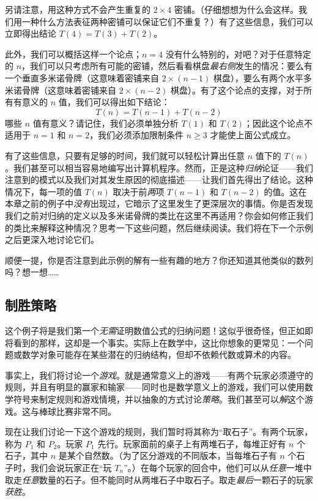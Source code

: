 另请注意，用这种方式不会产生重复的 $2 \times 4$ 密铺。（仔细想想为什么会这样。我们用一种什么方法表征两种密铺可以保证它们不重复？）有了这些信息，我们可以立即得出结论 $T(4) = T(3) + T(2)$。

此外，我们可以概括这样一个论点；$n = 4$ 没有什么特别的，对吧？对于任意特定的 $n$，我们可以只考虑所有可能的密铺，然后看看棋盘\textit{最右侧}发生的情况：要么有一个垂直多米诺骨牌（这意味着密铺来自 $2 \times (n - 1)$ 棋盘），要么有两个水平多米诺骨牌（这意味着密铺来自 $2 \times (n-2)$ 棋盘）。有了这个论点的支撑，对于所有有意义的 $n$ 值，我们可以得出如下结论：
\[T(n) = T(n - 1) + T(n - 2)\]
哪些 $n$ 值有意义？请记住，我们必须单独分析 $T(1)$ 和 $T(2)$；因此这个论点不适用于 $n=1$ 和 $n=2$，我们必须添加限制条件 $n \ge 3$ 才能使上面公式成立。

有了这些信息，只要有足够的时间，我们就可以轻松计算出任意 $n$ 值下的 $T(n)$。我们甚至可以相当容易地编写出计算机程序。然而，正是这种\textit{归纳}论证——我们注意到的模式以及我们对其发生原因的彻底描述——让我们首先得出了结论。这种情况下，每一项的值 $T(n)$ 取决于前\textit{两}项 $T(n-1)$ 和 $T(n-2)$ 的值。这在本章之前的例子中\textit{没有}出现过，它暗示了这里发生了更深层次的事情。你是否发现我们之前对归纳的定义以及多米诺骨牌的类比在这里不再适用？你会如何修正我们的类比来解释这种情况？思考一下这些问题，然后继续阅读。我们将在下一个示例之后更深入地讨论它们。

顺便一提，你是否注意到此示例的解有一些有趣的地方？你还知道其他类似的数列吗？想一想……

\subsection{制胜策略}

这个例子将是我们第一个\textit{无需}证明数值公式的归纳问题！这似乎很奇怪，但正如即将看到的那样，这却是一个事实。实际上在数学中，这比你想象的更常见：一个问题或数学对象可能存在某些潜在的归纳结构，但却不依赖代数或算术的内容。

事实上，我们将讨论一个\textit{游戏}。就是通常意义上的游戏——有两个玩家必须遵守的规则，并且有明显的赢家和输家——同时也是数学意义上的游戏，我们可以使用数学符号来制定规则和游戏情境，并以抽象的方式讨论\textit{策略}。我们甚至可以\textit{解}这个游戏。这与棒球比赛非常不同。

现在让我们讨论一下这个游戏的规则，我们暂时将其称为``取石子''。有两个玩家，称为 $P_1$ 和 $P_2$。玩家 $P_1$ 先行。玩家面前的桌子上有两堆石子，每堆正好有 $n$ 个石子，其中 $n$ 是某个自然数。（为了区分游戏的不同版本，当每堆石子有 $n$ 个石子时，我们会说玩家正在``玩 $T_n$''。）在每个玩家的回合中，他们可以从\textit{任意}一堆中取走\textit{任意}数量的石子。但不能同时从两堆石子中取石子。取走\textit{最后}一颗石子的玩家\textit{获胜}。

